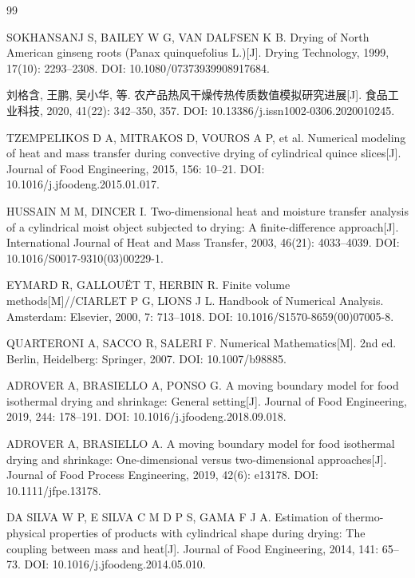 \documentclass[withoutpreface,bwprint]{cumcmthesis}
\begin{document}
\begingroup
\raggedright
\begin{thebibliography}{99}
\setlength{\itemsep}{4pt}

SOKHANSANJ S, BAILEY W G, VAN DALFSEN K B.
Drying of North American ginseng roots (Panax quinquefolius L.)[J].
Drying Technology, 1999, 17(10): 2293--2308.
DOI: 10.1080/07373939908917684.

刘格含, 王鹏, 吴小华, 等.
农产品热风干燥传热传质数值模拟研究进展[J].
食品工业科技, 2020, 41(22): 342--350, 357.
DOI: 10.13386/j.issn1002-0306.2020010245.

TZEMPELIKOS D A, MITRAKOS D, VOUROS A P, et al.
Numerical modeling of heat and mass transfer during convective drying of cylindrical quince slices[J].
Journal of Food Engineering, 2015, 156: 10--21.
DOI: 10.1016/j.jfoodeng.2015.01.017.

HUSSAIN M M, DINCER I.
Two-dimensional heat and moisture transfer analysis of a cylindrical moist object subjected to drying: A finite-difference approach[J].
International Journal of Heat and Mass Transfer, 2003, 46(21): 4033--4039.
DOI: 10.1016/S0017-9310(03)00229-1.

EYMARD R, GALLOU\"ET T, HERBIN R.
Finite volume methods[M]//CIARLET P G, LIONS J L. Handbook of Numerical Analysis. Amsterdam: Elsevier, 2000, 7: 713--1018.
DOI: 10.1016/S1570-8659(00)07005-8.

QUARTERONI A, SACCO R, SALERI F.
Numerical Mathematics[M]. 2nd ed. Berlin, Heidelberg: Springer, 2007.
DOI: 10.1007/b98885.

ADROVER A, BRASIELLO A, PONSO G.
A moving boundary model for food isothermal drying and shrinkage: General setting[J].
Journal of Food Engineering, 2019, 244: 178--191.
DOI: 10.1016/j.jfoodeng.2018.09.018.

ADROVER A, BRASIELLO A.
A moving boundary model for food isothermal drying and shrinkage: One-dimensional versus two-dimensional approaches[J].
Journal of Food Process Engineering, 2019, 42(6): e13178.
DOI: 10.1111/jfpe.13178.

DA SILVA W P, E SILVA C M D P S, GAMA F J A.
Estimation of thermo-physical properties of products with cylindrical shape during drying: The coupling between mass and heat[J].
Journal of Food Engineering, 2014, 141: 65--73.
DOI: 10.1016/j.jfoodeng.2014.05.010.

\end{thebibliography}
\endgroup
\end{document}
